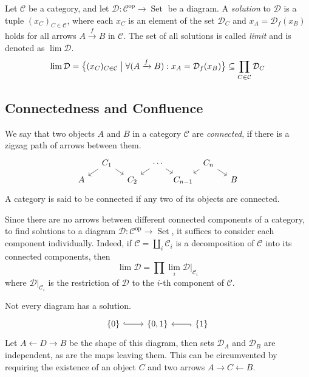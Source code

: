 \documentclass[preprint,12pt]{elsarticle}
\newcommand{\cat}[1]{\mathcal{#1}}
\newcommand{\op}{^{\mathop{op}}}
\DeclareMathOperator{\Set}{Set}
\begin{document}
\begin{defin}
    Let $\cat C$ be a category, and let $\cat D:\cat C\op\to\Set$ be a diagram.
    A \emph{solution} to $\cat D$ is a tuple $(x_C)_{C\in\cat C}$, where each $x_C$ is an element of the set $\cat D_C$ and $x_A=\cat D_f(x_B)$ holds for all arrows $A\xrightarrow{f}B$ in $\cat C$.
    The set of all solutions is called \emph{limit} and is denoted as $\lim\cat D$.
    $$
    \lim \cat D = 
    \big\{ (x_C)_{C\in\cat C} \bigm|\forall (A\xrightarrow{f}B) :x_A = \cat D_f(x_B) \big\}
    \subseteq\prod_{C\in\cat C}\cat D_C
    $$
\end{defin}

\subsection{Connectedness and Confluence}

\begin{defin}
\label{def:connected}
    We say that two objects $A$ and $B$ in a category $\cat C$ are \emph{connected}, if there is a zigzag path of arrows between them.
$$
\begin{tikzcd}[column sep={3em,between origins},row sep={2em,between origins}]
  & C_1 \arrow[rd] \arrow[ld] &         & \cdots \arrow[ld] \arrow[rd] &         & C_n \arrow[ld] \arrow[rd] &   \\
A &                               & C_2 &                              & C_{n-1}&                               & B
\end{tikzcd}
$$
A category is said to be connected if any two of its objects are connected.
\end{defin}

Since there are no arrows between different connected components of a category, to find solutions to a diagram $\cat D:\cat C\op\to\Set$, it suffices to consider each component individually. Indeed, if $\cat C =\coprod_{i}\cat C_i$ is a decomposition of $\cat C$ into its connected components, then
$$
\lim\cat D = \prod\lim_i\cat D|_{\cat C_i}
$$
where $\cat D|_{\cat C_i}$ is the restriction of $\cat D$ to the $i$-th component of $\cat C$.


\begin{exam}
\label{exam:confluence}
Not every diagram has a solution.
$$
\begin{tikzcd}
\{0\} \arrow[r, hook] & {\{0,1\}} & \{1\} \arrow[l, hook]
\end{tikzcd}
$$
Let $A\leftarrow D\to B$ be the shape of this diagram, then sets $\cat D_A$ and $\cat D_B$ are independent, as are the maps leaving them. This can be circumvented by requiring the existence of an object $C$ and two arrows $A\to C\leftarrow B$.
\end{exam}
\end{document}
